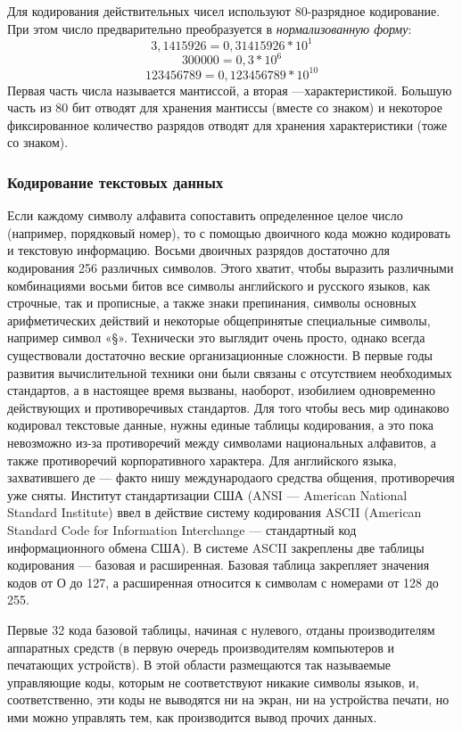 \documentclass[a4paper]{article}
\begin{document}
Для кодирования действительных чисел используют 80-разрядное кодирование. При этом число предварительно преобразуется в \textit{нормализованную форму}:
$$3,1415926 = 0,31415926*10^{1}$$
$$300 000 = 0,3*10^{6}$$
$$123 456 789 = 0,123456789*10^{10}$$
Первая часть числа называется мантиссой, а вторая ---характеристикой. Большую часть из 80 бит отводят для хранения мантиссы (вместе со знаком) и некоторое фиксированное количество разрядов отводят для хранения характеристики (тоже со знаком).

\subsubsection{Кодирование текстовых данных}

Если каждому символу алфавита сопоставить определенное целое число (например, порядковый номер), то с помощью двоичного кода можно кодировать и текстовую информацию. Восьми двоичных разрядов достаточно для кодирования 256 различных символов. Этого хватит, чтобы выразить различными комбинациями восьми битов все символы английского и русского языков, как строчные, так и прописные, а также знаки препинания, символы основных арифметических действий и некоторые общепринятые специальные символы, например символ «§».
Технически это выглядит очень просто, однако всегда существовали достаточно веские организационные сложности. В первые годы развития вычислительной техники они были связаны с отсутствием необходимых стандартов, а в настоящее время вызваны, наоборот, изобилием одновременно действующих и противоречивых стандартов. Для того чтобы весь мир одинаково кодировал текстовые данные, нужны единые таблицы кодирования, а это пока невозможно из-за противоречий между символами национальных алфавитов, а также противоречий корпоративного характера. Для английского языка, захватившего де --- факто нишу международаого средства общения, противоречия уже сняты. Институт стандартизации США (ANSI — American National Standard Institute) ввел в действие систему кодирования ASCII (American Standard Code for Information Interchange — стандартный код информационного обмена США). В системе ASCII закреплены две таблицы кодирования --- базовая и расширенная. Базовая таблица закрепляет значения кодов от О до 127, а расширенная относится к символам с номерами от 128 до 255.

Первые 32 кода базовой таблицы, начиная с нулевого, отданы производителям аппаратных средств (в первую очередь производителям компьютеров и печатающих устройств). В этой области размещаются так называемые управляющие коды, которым не соответствуют никакие символы языков, и, соответственно, эти коды не выводятся ни на экран, ни на устройства печати, но ими можно управлять тем, как производится вывод прочих данных.
\end{document}

